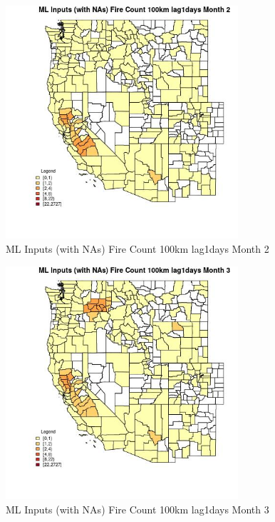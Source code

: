 \begin{figure} 
\centering  
\includegraphics[width=0.77\textwidth]{Code_Outputs/Report_ML_input_PM25_Step4_part_f_de_duplicated_aveswNAs_CountyFire_Count_100km_lag1daysmedianMonth2.jpg} 
\caption{\label{fig:Report_ML_input_PM25_Step4_part_f_de_duplicated_aveswNAsCountyFire_Count_100km_lag1daysmedianMonth2}ML Inputs (with NAs) Fire Count 100km lag1days Month 2} 
\end{figure} 
 

\begin{figure} 
\centering  
\includegraphics[width=0.77\textwidth]{Code_Outputs/Report_ML_input_PM25_Step4_part_f_de_duplicated_aveswNAs_CountyFire_Count_100km_lag1daysmedianMonth3.jpg} 
\caption{\label{fig:Report_ML_input_PM25_Step4_part_f_de_duplicated_aveswNAsCountyFire_Count_100km_lag1daysmedianMonth3}ML Inputs (with NAs) Fire Count 100km lag1days Month 3} 
\end{figure} 
 

